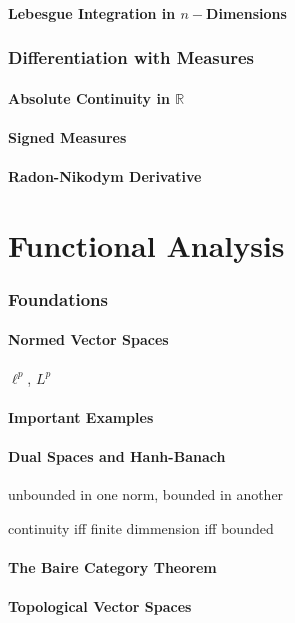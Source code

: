 \documentclass{article}
\newcommand{\R}{\mathbb{R}}
\theoremstyle{definition}
\begin{document}
	\subsection{Lebesgue Integration in $ n- $Dimensions}
	\section{Differentiation with Measures}
	\subsection{Absolute Continuity in $ \R $}
	\subsection{Signed Measures}
	\subsection{Radon-Nikodym Derivative}
	
	\part{Functional Analysis}
	
	\section{Foundations}
	\subsection{Normed Vector Spaces}
	$ \ell^p $, $ L^p $
	\subsection{Important Examples}
	\subsection{Dual Spaces and Hanh-Banach}
	unbounded in one norm, bounded in another %
	
	continuity iff finite dimmension iff bounded
	\subsection{The Baire Category Theorem}
	\subsection{Topological Vector Spaces}
\end{document}
